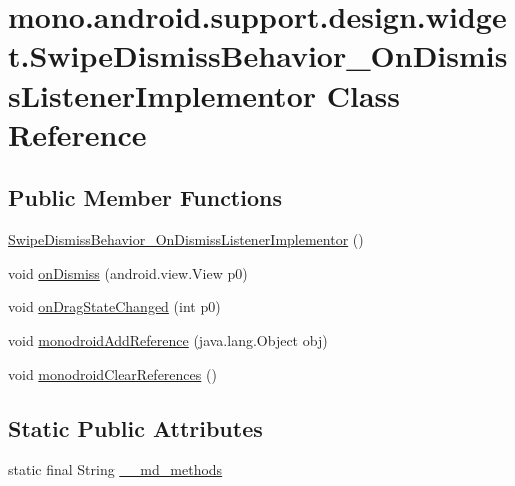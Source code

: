 \hypertarget{classmono_1_1android_1_1support_1_1design_1_1widget_1_1_swipe_dismiss_behavior___on_dismiss_listener_implementor}{
\section{mono.android.support.design.widget.SwipeDismissBehavior\_\-OnDismissListenerImplementor Class Reference}
\label{classmono_1_1android_1_1support_1_1design_1_1widget_1_1_swipe_dismiss_behavior___on_dismiss_listener_implementor}
}
\subsection*{Public Member Functions}
\begin{CompactItemize}
\item 
\hyperlink{classmono_1_1android_1_1support_1_1design_1_1widget_1_1_swipe_dismiss_behavior___on_dismiss_listener_implementor_60f50a52224120968abc3980c5f7958f}{SwipeDismissBehavior\_\-OnDismissListenerImplementor} ()
\item 
void \hyperlink{classmono_1_1android_1_1support_1_1design_1_1widget_1_1_swipe_dismiss_behavior___on_dismiss_listener_implementor_02089f50a204509626734dd1c055ab1a}{onDismiss} (android.view.View p0)
\item 
void \hyperlink{classmono_1_1android_1_1support_1_1design_1_1widget_1_1_swipe_dismiss_behavior___on_dismiss_listener_implementor_6aa730cbfa98df31e7c6b6ec5ed7fe80}{onDragStateChanged} (int p0)
\item 
void \hyperlink{classmono_1_1android_1_1support_1_1design_1_1widget_1_1_swipe_dismiss_behavior___on_dismiss_listener_implementor_e605fb05b54f87719255cdd580d427aa}{monodroidAddReference} (java.lang.Object obj)
\item 
void \hyperlink{classmono_1_1android_1_1support_1_1design_1_1widget_1_1_swipe_dismiss_behavior___on_dismiss_listener_implementor_c75831ca6f427928cf49cef6c842e8d6}{monodroidClearReferences} ()
\end{CompactItemize}
\subsection*{Static Public Attributes}
\begin{CompactItemize}
\item 
static final String \hyperlink{classmono_1_1android_1_1support_1_1design_1_1widget_1_1_swipe_dismiss_behavior___on_dismiss_listener_implementor_74474e8db31efe7e1470f76275367cfe}{\_\-\_\-md\_\-methods}
\end{CompactItemize}
